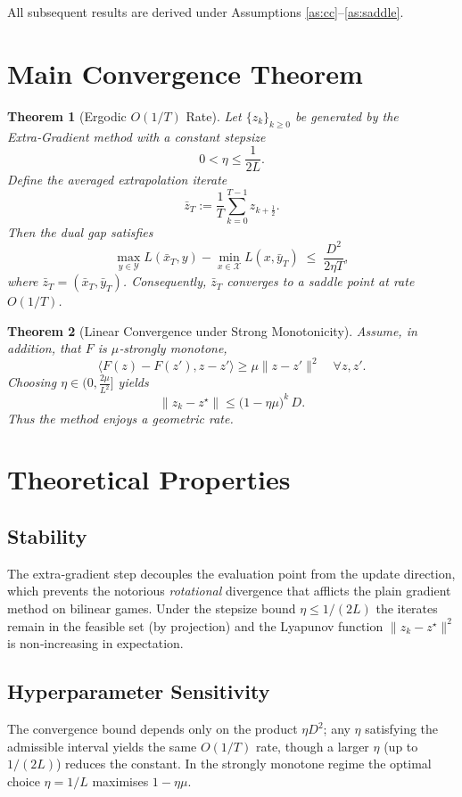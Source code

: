 \documentclass{article}
\newtheorem{theorem}{Theorem}
\begin{document}
All subsequent results are derived under Assumptions \ref{as:cc}–\ref{as:saddle}.

\section{Main Convergence Theorem}
\begin{theorem}[Ergodic $O(1/T)$ Rate]\label{thm:rate}
Let $\{z_{k}\}_{k\ge0}$ be generated by the Extra‑Gradient method with a constant stepsize
\[
0<\eta\le \frac{1}{2L}.
\]
Define the averaged extrapolation iterate
\[
\bar z_{T}:=\frac{1}{T}\sum_{k=0}^{T-1}z_{k+\frac12}.
\]
Then the \emph{dual gap} satisfies
\[
\max_{y\in\mathcal{Y}}L(\bar x_{T},y)-\min_{x\in\mathcal{X}}L(x,\bar y_{T})
\;\le\;\frac{D^{2}}{2\eta T},
\]
where $\bar z_{T}=(\bar x_{T},\bar y_{T})$.
Consequently, $\bar z_{T}$ converges to a saddle point at rate $O(1/T)$.
\end{theorem}

\begin{theorem}[Linear Convergence under Strong Monotonicity]\label{thm:linear}
Assume, in addition, that $F$ is $\mu$‑strongly monotone,
\[
\langle F(z)-F(z'),z-z'\rangle\ge \mu\|z-z'\|^{2}\quad\forall z,z'.
\]
Choosing $\eta\in\bigl(0,\frac{2\mu}{L^{2}}\bigr]$ yields
\[
\|z_{k}-z^{\star}\|\le\bigl(1-\eta\mu\bigr)^{k}\,D .
\]
Thus the method enjoys a geometric rate.
\end{theorem}

\section{Theoretical Properties}
\subsection{Stability}
The extra‑gradient step decouples the evaluation point from the update direction, which prevents the notorious \emph{rotational} divergence that afflicts the plain gradient method on bilinear games. Under the stepsize bound $\eta\le 1/(2L)$ the iterates remain in the feasible set (by projection) and the Lyapunov function $\|z_{k}-z^{\star}\|^{2}$ is non‑increasing in expectation.

\subsection{Hyperparameter Sensitivity}
The convergence bound depends only on the product $\eta D^{2}$; any $\eta$ satisfying the admissible interval yields the same $O(1/T)$ rate, though a larger $\eta$ (up to $1/(2L)$) reduces the constant. In the strongly monotone regime the optimal choice $\eta=1/L$ maximises $1-\eta\mu$.
\end{document}
